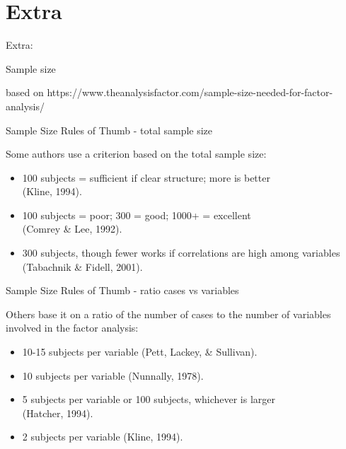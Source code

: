 \documentclass[10pt]{beamer}\usepackage[]{graphicx}\usepackage[]{xcolor}
\begin{document}
\section{Extra}

\begin{frame}
	
	\begin{center}
		\Huge{Extra:}
		
		\large{Sample size}
	\end{center}
	
	\vspace*{15mm}
	
based on https://www.theanalysisfactor.com/sample-size-needed-for-factor-analysis/

\end{frame}
%
\begin{frame}{Sample Size Rules of Thumb - total sample size}
	
Some authors use a criterion based on the total sample size:
~\\

\begin{itemize}
\item 100 subjects = sufficient if clear structure; more is better \\ (Kline, 1994).
\item 100 subjects = poor; 300 = good; 1000+ = excellent \\ (Comrey \& Lee, 1992).
\item 300 subjects, though fewer works if correlations are high among variables \\ (Tabachnik \& Fidell, 2001).
\end{itemize}

\end{frame}
%
\begin{frame}{Sample Size Rules of Thumb - ratio cases vs variables}
	
Others base it on a ratio of the number of cases to the number of variables involved in the factor analysis:
~\\

\begin{itemize}
\item 10-15 subjects per variable (Pett, Lackey, \& Sullivan).
\item 10 subjects per variable (Nunnally, 1978).
\item 5 subjects per variable or 100 subjects, whichever is larger \\ (Hatcher, 1994).
\item 2 subjects per variable (Kline, 1994).
\end{itemize}

\end{frame}
\end{document}
